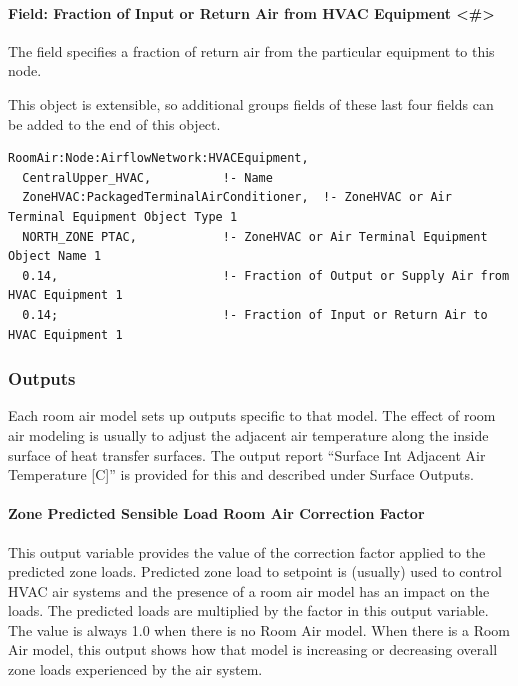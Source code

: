 \paragraph{Field: Fraction of Input or Return Air from HVAC Equipment \textless{}\#\textgreater{}}\label{field-fraction-of-input-or-return-air-from-hvac-equipment-x}

The field specifies a fraction of return air from the particular equipment to this node.

This object is extensible, so additional groups fields of these last four fields can be added to the end of this object.

\begin{lstlisting}
RoomAir:Node:AirflowNetwork:HVACEquipment,
  CentralUpper_HVAC,          !- Name
  ZoneHVAC:PackagedTerminalAirConditioner,  !- ZoneHVAC or Air Terminal Equipment Object Type 1
  NORTH_ZONE PTAC,            !- ZoneHVAC or Air Terminal Equipment Object Name 1
  0.14,                       !- Fraction of Output or Supply Air from HVAC Equipment 1
  0.14;                       !- Fraction of Input or Return Air to HVAC Equipment 1
\end{lstlisting}

\subsubsection{Outputs}\label{outputs-1-023}

Each room air model sets up outputs specific to that model. The effect of room air modeling is usually to adjust the adjacent air temperature along the inside surface of heat transfer surfaces. The output report ``Surface Int Adjacent Air Temperature {[}C{]}'' is provided for this and described under Surface Outputs.

\paragraph{Zone Predicted Sensible Load Room Air Correction Factor}\label{zone-predicted-sensible-load-room-air-correction-factor}

This output variable provides the value of the correction factor applied to the predicted zone loads. Predicted zone load to setpoint is (usually) used to control HVAC air systems and the presence of a room air model has an impact on the loads. The predicted loads are multiplied by the factor in this output variable. The value is always 1.0 when there is no Room Air model. When there is a Room Air model, this output shows how that model is increasing or decreasing overall zone loads experienced by the air system.

